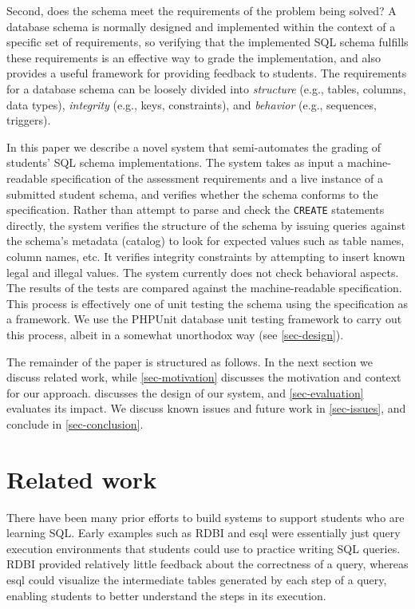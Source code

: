 \documentclass[sigconf, review, anonymous, capitalise]{acmart}
\begin{document}
Second, does the schema meet the requirements of the problem being solved? A database schema is normally designed and implemented within the context of a specific set of requirements, so verifying that the implemented SQL schema fulfills these requirements is an effective way to grade the implementation, and also provides a useful framework for providing feedback to students. The requirements for a database schema can be loosely divided into \emph{structure} (e.g., tables, columns, data types), \emph{integrity} (e.g., keys, constraints), and \emph{behavior} (e.g., sequences, triggers).

In this paper we describe a novel system that semi-automates the grading of students' SQL schema implementations. The system takes as input a machine-readable specification of the assessment requirements and a live instance of a submitted student schema, and verifies whether the schema conforms to the specification. Rather than attempt to parse and check the \texttt{CREATE} statements directly, the system verifies the structure of the schema by issuing queries against the schema's metadata (catalog) to look for expected values such as table names, column names, etc. It verifies integrity constraints by attempting to insert known legal and illegal values. The system currently does not check behavioral aspects. The results of the tests are compared against the machine-readable specification. This process is effectively one of unit testing the schema using the specification as a framework. We use the PHPUnit database unit testing framework to carry out this process, albeit in a somewhat unorthodox way (see \cref{sec-design}).

The remainder of the paper is structured as follows. In the next section we discuss related work, while \cref{sec-motivation} discusses the motivation and context for our approach.  discusses the design of our system, and \cref{sec-evaluation} evaluates its impact. We discuss known issues and future work in \cref{sec-issues}, and conclude in \cref{sec-conclusion}.


\section{Related work}
\label{sec-literature}

There have been many prior efforts to build systems to support students who are learning SQL. Early examples such as RDBI \cite{Dietrich.S-1993a-An-educational} and esql \cite{Kearns.R-1997a-A-teaching} were essentially just query execution environments that students could use to practice writing SQL queries. RDBI provided relatively little feedback about the correctness of a query, whereas esql could visualize the intermediate tables generated by each step of a query, enabling students to better understand the steps in its execution.
\end{document}
